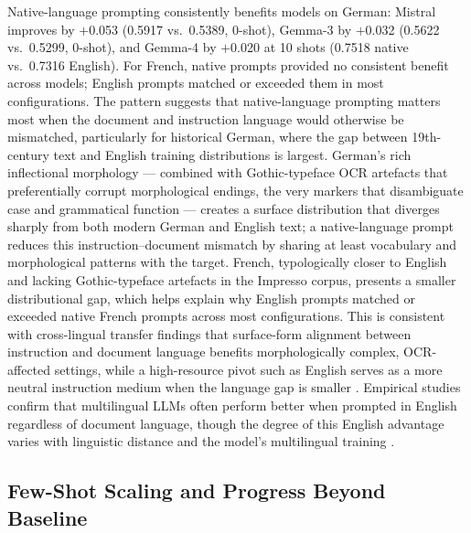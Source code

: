 \documentclass[
]{ceurart}
\theoremstyle{definition}
\begin{document}
Native-language prompting consistently benefits models on German: Mistral improves by $+$0.053 (0.5917 vs.\ 0.5389, 0-shot), Gemma-3 by $+$0.032 (0.5622 vs.\ 0.5299, 0-shot), and Gemma-4 by $+$0.020 at 10 shots (0.7518 native vs.\ 0.7316 English).
For French, native prompts provided no consistent benefit across models; English prompts matched or exceeded them in most configurations.
The pattern suggests that native-language prompting matters most when the document and instruction language would otherwise be mismatched, particularly for historical German, where the gap between 19th-century text and English training distributions is largest.
German's rich inflectional morphology --- combined with Gothic-typeface OCR artefacts that preferentially corrupt morphological endings, the very markers that disambiguate case and grammatical function --- creates a surface distribution that diverges sharply from both modern German and English text; a native-language prompt reduces this instruction--document mismatch by sharing at least vocabulary and morphological patterns with the target.
French, typologically closer to English and lacking Gothic-typeface artefacts in the Impresso corpus, presents a smaller distributional gap, which helps explain why English prompts matched or exceeded native French prompts across most configurations.
This is consistent with cross-lingual transfer findings that surface-form alignment between instruction and document language benefits morphologically complex, OCR-affected settings, while a high-resource pivot such as English serves as a more neutral instruction medium when the language gap is smaller \citep{ali2025multilingual,etxaniz2024multilingual}.
Empirical studies confirm that multilingual LLMs often perform better when prompted in English regardless of document language, though the degree of this English advantage varies with linguistic distance and the model's multilingual training \citep{etxaniz2024multilingual,mondshine2025beyond}.

\subsection{Few-Shot Scaling and Progress Beyond Baseline}
\end{document}
